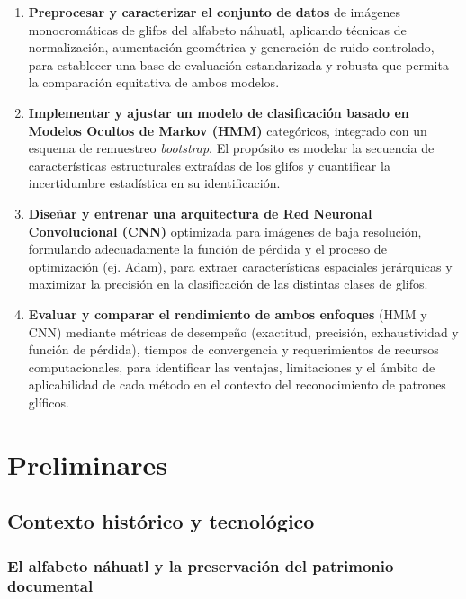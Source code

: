 \documentclass[
  spanish,
  us-letterpaper,
  DIV=11,
  numbers=noendperiod]{scrreprt}
\begin{document}
\begin{enumerate}
\def\labelenumi{\arabic{enumi}.}
\item
  \textbf{Preprocesar y caracterizar el conjunto de datos} de imágenes
  monocromáticas de glifos del alfabeto náhuatl, aplicando técnicas de
  normalización, aumentación geométrica y generación de ruido
  controlado, para establecer una base de evaluación estandarizada y
  robusta que permita la comparación equitativa de ambos modelos.
\item
  \textbf{Implementar y ajustar un modelo de clasificación basado en
  Modelos Ocultos de Markov (HMM)} categóricos, integrado con un esquema
  de remuestreo \emph{bootstrap}. El propósito es modelar la secuencia
  de características estructurales extraídas de los glifos y cuantificar
  la incertidumbre estadística en su identificación.
\item
  \textbf{Diseñar y entrenar una arquitectura de Red Neuronal
  Convolucional (CNN)} optimizada para imágenes de baja resolución,
  formulando adecuadamente la función de pérdida y el proceso de
  optimización (ej. Adam), para extraer características espaciales
  jerárquicas y maximizar la precisión en la clasificación de las
  distintas clases de glifos.
\item
  \textbf{Evaluar y comparar el rendimiento de ambos enfoques} (HMM y
  CNN) mediante métricas de desempeño (exactitud, precisión,
  exhaustividad y función de pérdida), tiempos de convergencia y
  requerimientos de recursos computacionales, para identificar las
  ventajas, limitaciones y el ámbito de aplicabilidad de cada método en
  el contexto del reconocimiento de patrones glíficos.
\end{enumerate}


\chapter{Preliminares}\label{preliminares}

\section{Contexto histórico y
tecnológico}\label{contexto-histuxf3rico-y-tecnoluxf3gico}

\subsection{El alfabeto náhuatl y la preservación del patrimonio
documental}\label{el-alfabeto-nuxe1huatl-y-la-preservaciuxf3n-del-patrimonio-documental}
\end{document}
